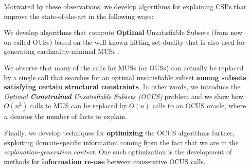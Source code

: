 Motivated by these observations, we develop algorithms for explaining CSPs that improve the state-of-the-art in the following ways: 
\begin{compactitem}
 \item We develop algorithms that compute \textbf{Optimal} Unsatisfiable Subsets (from now on called OUSs) based on the well-known hitting-set duality that is also used for generating cardinality-minimal MUSs \cite{ignatiev2015smallest}.
\item We observe that many of the calls for MUSs (or OUSs) can actually be replaced by a single call that searches for an optimal unsatisfiable subset \textbf{among subsets satisfying certain structural constraints}. In other words, we introduce the \emph{Optimal \textbf{Constrained} Unsatisfiable Subsets (OCUS)} problem and we show how $O(n^2)$ calls to MUS can be replaced by $O(n)$ calls to an OCUS oracle, where $n$ denotes the number of facts to explain. 
\item Finally, we develop techniques for \textbf{optimizing} the OCUS algorithms further, exploiting domain-specific information coming from the fact that we are in the  \emph{explanation-generation context}. One such optimization is the development of methods for \textbf{information re-use} between consecutive OCUS calls.
% 
% 
\end{compactitem}



